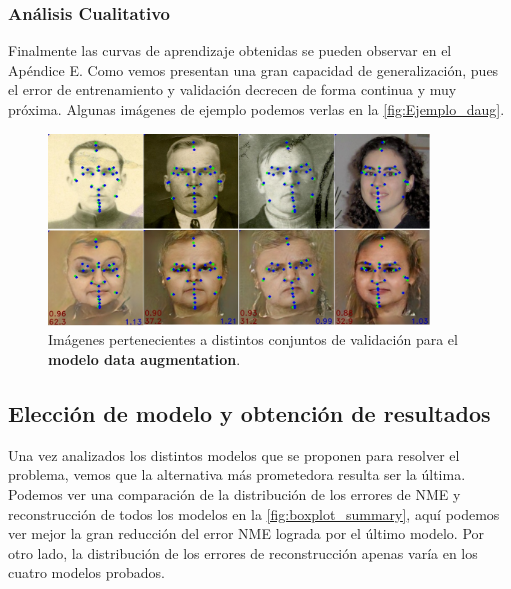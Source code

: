         
        \subsubsection*{Análisis Cualitativo}
        \noindent Finalmente las curvas de aprendizaje obtenidas se pueden observar en el Apéndice E. Como vemos presentan una gran capacidad de generalización, pues el error de entrenamiento y validación decrecen de forma continua y muy próxima. Algunas imágenes de ejemplo podemos verlas en la \autoref{fig:Ejemplo_daug}.

        \begin{figure}[H]
            \centering
            \includegraphics[width=0.9\textwidth]{img/image_daug.png}
            \caption{Imágenes pertenecientes a distintos conjuntos de validación para el \textbf{modelo data augmentation}.}
            \label{fig:Ejemplo_daug}
        \end{figure}
    \newpage
    \subsection{Elección de modelo y obtención de resultados}

        \noindent Una vez analizados los distintos modelos que se proponen para resolver el problema, vemos que la alternativa más prometedora resulta ser la última. Podemos ver una comparación de la distribución de los errores de NME y reconstrucción de todos los modelos en la \autoref{fig:boxplot_summary}, aquí podemos ver mejor la gran reducción del error NME lograda por el último modelo. Por otro lado, la distribución de los errores de reconstrucción apenas varía en los cuatro modelos probados. 
        

